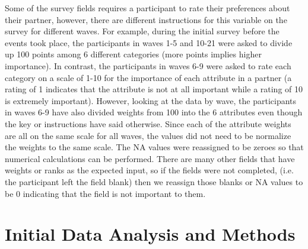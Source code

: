 \documentclass{article}
\begin{document}
Some of the survey fields requires a participant to rate their preferences about their partner, however, there are different instructions for this variable on the survey for different waves.  For example, during the initial survey before the events took place, the participants in waves 1-5 and 10-21 were asked to divide up 100 points among 6 different categories (more points implies higher importance).  In contrast, the participants in waves 6-9 were asked to rate each category on a scale of 1-10 for the importance of each attribute in a partner (a rating of 1 indicates that the attribute is not at all important while a rating of 10 is extremely important).  However, looking at the data by wave, the participants in waves 6-9 have also divided weights from 100 into the 6 attributes even though the key or instructions have said otherwise. Since each of the attribute weights are all on the same scale for all waves, the values did not need to be normalize the weights to the same scale.  The NA values were reassigned to be zeroes so that numerical calculations can be performed.  There are many other fields that have weights or ranks as the expected input, so if the fields were not completed, (i.e. the participant left the field blank) then we reassign those blanks or NA values to be 0 indicating that the field is not important to them.\\



\section{Initial Data Analysis and Methods}
\end{document}
